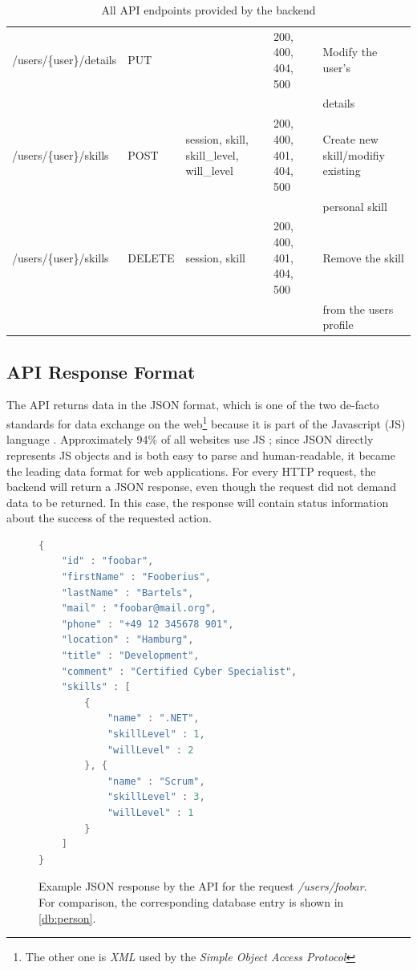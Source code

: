 \begin{table}[p]
{\begin{tabular}{l|l|l|l|l}
  /users/\{user\}/details        & PUT    &                                             & 200, 400, 404, 500           & Modify the user's\\ & & & & details \\ \hline
  /users/\{user\}/skills & POST   & session, skill, skill\_level, will\_level & 200, 400, 401, 404, 500 & Create new skill/modifiy existing\\ & & & & personal skill\\ \hline
  /users/\{user\}/skills & DELETE & session, skill                              & 200, 400, 401, 404, 500 & Remove the skill\\ & & & & from the users profile\\
  \end{tabular}
  }
\caption[API Endpoints]{All API endpoints provided by the backend}
\label{swaggertable}
\end{table}
\subsection{API Response Format}
The API returns data in the JSON format, which is one of the two de-facto standards for data exchange on the web\footnote{The other one is \textit{XML} used by the \textit{Simple Object Access Protocol}} because it is part of the Javascript (JS) language \cite[p. 37]{json}. Approximately 94\% of all websites use JS \cite{jsmarket}; since JSON directly represents JS objects and is both easy to parse and human-readable, it became the leading data format for web applications.
For every HTTP request, the backend will return a JSON response, even though the request did not demand data to be returned. In this case, the response will contain status information about the success of the requested action.

\begin{figure}[h]
\begin{lstlisting}[language=Java]
{
	"id" : "foobar",
	"firstName" : "Fooberius",
	"lastName" : "Bartels",
	"mail" : "foobar@mail.org",
	"phone" : "+49 12 345678 901",
	"location" : "Hamburg",
	"title" : "Development",
	"comment" : "Certified Cyber Specialist",
	"skills" : [
		{
			"name" : ".NET",
			"skillLevel" : 1,
			"willLevel" : 2
		}, {
			"name" : "Scrum",
			"skillLevel" : 3,
			"willLevel" : 1
		}
	]
}
\end{lstlisting}
\caption[Data Structure: Person API Response]{Example JSON response by the API for the request \textit{/users/foobar}. For comparison, the corresponding database entry is shown in \ref{db:person}.}
\end{figure}



